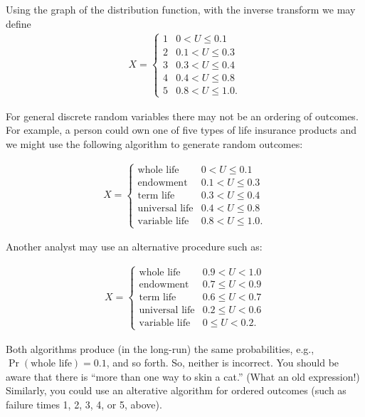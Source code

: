 \documentclass[]{book}
\begin{document}
Using the graph of the distribution function, with the inverse transform
we may define \[\begin{aligned}
X = \left\{ \begin{array}{cc}
              1 &   0<U  \leq 0.1  \\
              2 &  0.1 < U  \leq  0.3\\
              3 &  0.3 < U  \leq  0.4\\
              4 &  0.4 < U  \leq  0.8  \\
              5 &  0.8 < U  \leq  1.0     .
            \end{array} \right.\end{aligned}\]

For general discrete random variables there may not be an ordering of
outcomes. For example, a person could own one of five types of life
insurance products and we might use the following algorithm to generate
random outcomes:

\[\begin{aligned}
X = \left\{ \begin{array}{cc}
  \textrm{whole life} &   0<U  \leq 0.1  \\
 \textrm{endowment} &  0.1 < U  \leq  0.3\\
\textrm{term life} &  0.3 < U  \leq  0.4\\
  \textrm{universal life} &  0.4 < U  \leq  0.8  \\
  \textrm{variable life} &  0.8 < U  \leq  1.0 .
            \end{array} \right.\end{aligned}\]

Another analyst may use an alternative procedure such as:

\[\begin{aligned}
X = \left\{ \begin{array}{cc}
  \textrm{whole life} &   0.9<U<1.0  \\
 \textrm{endowment} &  0.7 \leq U < 0.9\\
\textrm{term life} &  0.6 \leq U < 0.7\\
  \textrm{universal life} &  0.2 \leq U < 0.6  \\
  \textrm{variable life} &  0 \leq U < 0.2 .
            \end{array} \right.\end{aligned}\]

Both algorithms produce (in the long-run) the same probabilities, e.g.,
\(\Pr(\textrm{whole life})=0.1\), and so forth. So, neither is
incorrect. You should be aware that there is ``more than one way to skin
a cat.'' (What an old expression!) Similarly, you could use an
alterative algorithm for ordered outcomes (such as failure times 1, 2,
3, 4, or 5, above).
\end{document}
